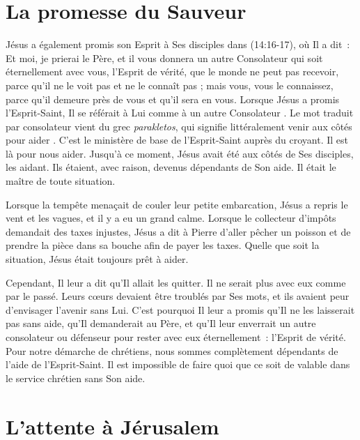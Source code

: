 \section{La promesse du Sauveur}

\begin{specialpar}{\BRallowhypbch}
Jésus a également promis son Esprit à Ses disciples dans
 (14:16-17), où Il a dit~:
 \og Et moi, je prierai le Père, et il vous donnera un autre Consolateur
 qui soit éternellement avec vous, l'Esprit de vérité, que le monde ne peut
 pas recevoir, parce qu'il ne le voit pas et ne le connaît pas ; mais vous,
 vous le connaissez, parce qu'il demeure près de vous
 et qu'il sera en vous. \fg{}
 Lorsque Jésus a promis l'Esprit-Saint, Il se référait à Lui comme à
 \og un autre Consolateur \fg{}.
 Le mot traduit par \og consolateur \fg{} vient du grec \emph{parakletos},
 qui signifie littéralement \og venir aux côtés pour aider \fg{}.
 C'est le ministère de base de l'Esprit-Saint auprès du croyant.
 Il est là pour nous aider. Jusqu'à ce moment, Jésus avait été aux côtés
 de Ses disciples, les aidant. Ils étaient, avec raison, devenus dépendants
 de Son aide. Il était le maître de toute situation.
\end{specialpar}

Lorsque la tempête menaçait de couler leur petite embarcation, Jésus
 a repris le vent et les vagues, et il y a eu un grand calme.
 Lorsque le collecteur d'impôts demandait des taxes injustes,
 Jésus a dit à Pierre d'aller pêcher un poisson et de prendre
 la pièce dans sa bouche afin de payer les taxes.
 Quelle que soit la situation, Jésus était toujours prêt à aider.

Cependant, Il leur a dit qu'Il allait les quitter.
 Il ne serait plus avec eux comme par le passé.
 Leurs cœurs devaient être troublés par Ses mots,
 et ils avaient peur d'envisager l'avenir sans Lui.
 C'est pourquoi Il leur a promis qu'Il ne les laisserait pas sans aide,
 qu'Il demanderait au Père, et qu'Il leur enverrait un autre consolateur
 ou défenseur pour rester avec eux éternellement~:
 l'Esprit de vérité.
 Pour notre démarche de chrétiens, nous sommes complètement dépendants de
 l'aide de l'Esprit-Saint.
 Il est impossible de faire quoi que ce soit de valable dans le service
 chrétien sans Son aide.

\section{L'attente \`a J\'erusalem}

